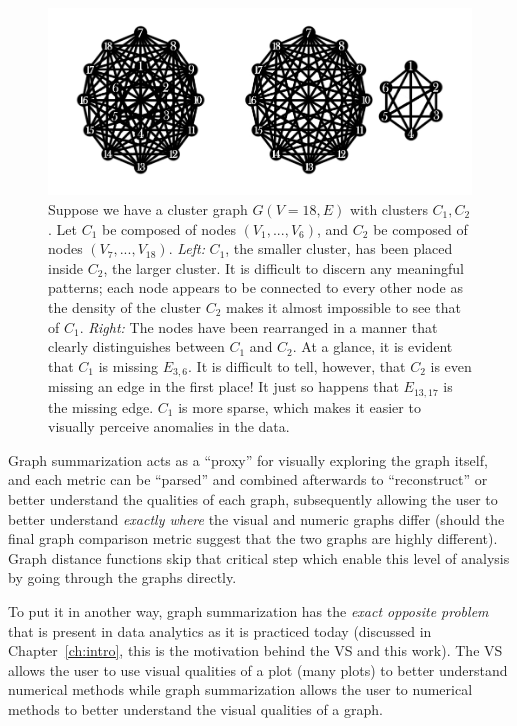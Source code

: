 \begin{figure}[htb]
	\begin{center}
		\includegraphics[width=1\linewidth]{ch-gc/figures/arr_density}
		\caption[Difficulties with graph visualization.]{
		Suppose we have a cluster graph $G(V = 18,E)$ with clusters $C_1,C_2$. 
		Let $C_1$ be composed of nodes $(V_1,...,V_6)$, and $C_2$ be composed 
		of nodes $(V_7,...,V_{18})$. 
		\textit{Left:} $C_1$, the smaller cluster, has been placed inside 
		$C_2$, the larger cluster. It is difficult to discern any meaningful 
		patterns; each node appears to be connected to every other node as the 
		density of the cluster $C_2$ makes it almost impossible to see that of 
		$C_1$.
		\textit{Right:} The nodes have been rearranged in a manner that clearly 
		distinguishes between $C_1$ and $C_2$. At a glance, it is evident that 
		$C_1$ is missing $E_{3,6}$. It is difficult to tell, however, that 
		$C_2$ is even missing an edge in the first place! It just so happens 
		that $E_{13,17}$ is the missing edge.
		$C_1$ is more sparse, which makes it easier to visually perceive 
		anomalies in the data.}
		\label{fig:gc:arr_density}
	\end{center}
\end{figure}

Graph summarization acts as a ``proxy'' for visually exploring the graph 
itself, and each metric can be ``parsed'' and combined afterwards to 
``reconstruct'' or better understand the qualities of each graph, subsequently 
allowing the user to better understand \textit{exactly where} the visual and 
numeric graphs differ (should the final graph comparison metric suggest that 
the two graphs are highly different). Graph distance functions skip that 
critical step which enable this level of analysis by going through the graphs 
directly.

To put it in another way, graph summarization has the \textit{exact opposite 
problem} that is present in data analytics as it is practiced today (discussed 
in Chapter~\ref{ch:intro}, this is the motivation behind the VS and this work). 
The VS allows the user to use visual qualities of a plot (many plots) to better 
understand numerical methods while graph summarization allows the user to 
numerical methods to better understand the visual qualities of a graph. 

